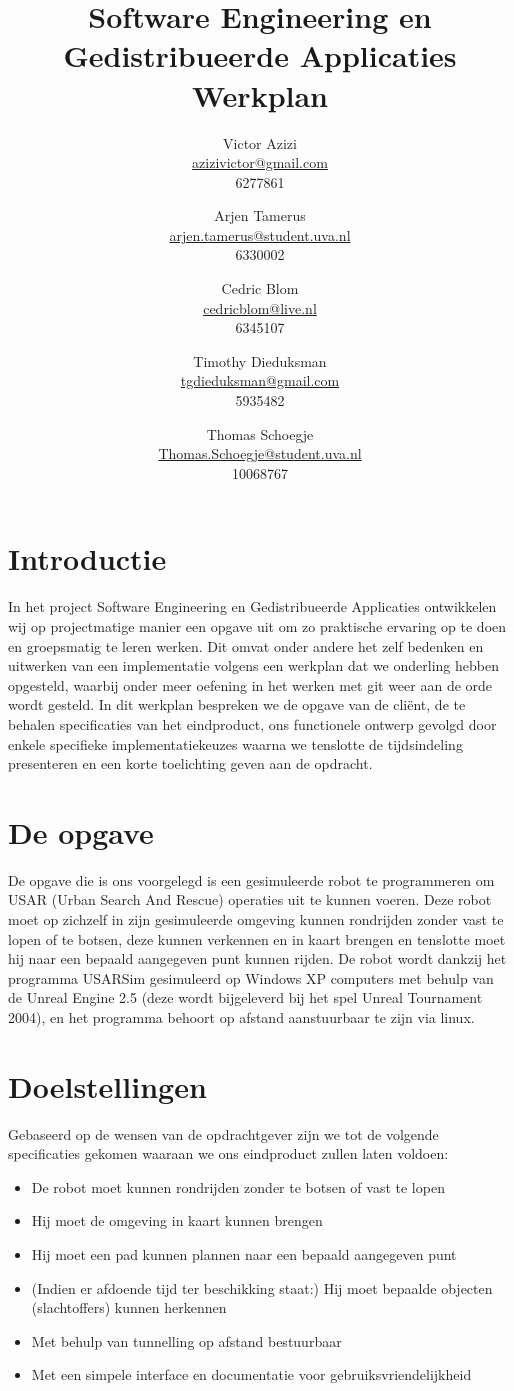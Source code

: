 \documentclass[a4paper, 11pt]{article}
\title{Software Engineering en Gedistribueerde Applicaties \\ Werkplan}
\author{Victor Azizi \\ \url{azizivictor@gmail.com} \\ 6277861 \and
Arjen Tamerus \\ \url{arjen.tamerus@student.uva.nl} \\ 6330002 \and
Cedric Blom \\ \url{cedricblom@live.nl} \\ 6345107 \and
Timothy Dieduksman \\ \url{tgdieduksman@gmail.com} \\ 5935482 \and
Thomas Schoegje \\ \url{Thomas.Schoegje@student.uva.nl} \\10068767}
\begin{document}
\maketitle
\clearpage

\section*{Introductie}
  In het project Software Engineering en Gedistribueerde Applicaties ontwikkelen wij op projectmatige manier een 
  opgave uit om zo praktische ervaring op te doen en groepsmatig te leren werken. Dit omvat onder andere het zelf
  bedenken en uitwerken van een implementatie volgens een werkplan dat we onderling hebben opgesteld, waarbij onder
  meer oefening in het werken met git weer aan de orde wordt gesteld. In dit werkplan bespreken we de opgave van de
  cli\"ent, de te behalen specificaties van het eindproduct, ons functionele ontwerp gevolgd door enkele specifieke
  implementatiekeuzes waarna we tenslotte de tijdsindeling presenteren en een korte toelichting geven aan de opdracht.

\section*{De opgave}
  De opgave die is ons voorgelegd is een gesimuleerde robot te programmeren om USAR (Urban Search And Rescue)
  operaties uit te kunnen voeren. Deze robot moet op zichzelf in zijn gesimuleerde omgeving kunnen rondrijden 
  zonder vast te lopen of te botsen, deze kunnen verkennen en in kaart brengen en tenslotte moet hij naar een 
  bepaald aangegeven punt kunnen rijden. De robot wordt dankzij het programma USARSim gesimuleerd op
  Windows XP computers met behulp van de Unreal Engine 2.5 
  (deze wordt bijgeleverd bij het spel Unreal Tournament 2004), en het programma behoort op afstand 
  aanstuurbaar te zijn via linux.

\section*{Doelstellingen}
  Gebaseerd op de wensen van de opdrachtgever zijn we tot de volgende specificaties gekomen waaraan we ons 
  eindproduct zullen laten voldoen:
  \begin{itemize}
   \item De robot moet kunnen rondrijden zonder te botsen of vast te lopen
   \item Hij moet de omgeving in kaart kunnen brengen
   \item Hij moet een pad kunnen plannen naar een bepaald aangegeven punt
   \item (Indien er afdoende tijd ter beschikking staat:) Hij moet bepaalde objecten (slachtoffers) kunnen herkennen
   \item Met behulp van tunnelling op afstand bestuurbaar
   \item Met een simpele interface en documentatie voor gebruiksvriendelijkheid
  \end{itemize}
\end{document}
